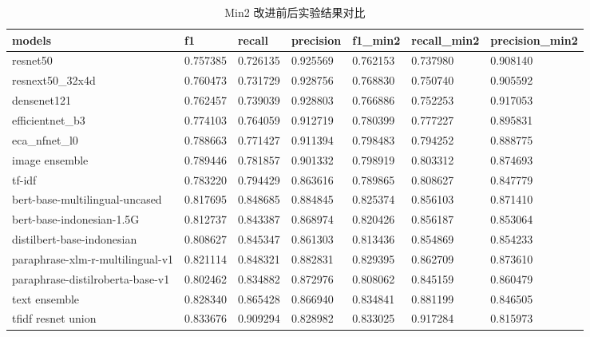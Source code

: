 \documentclass[12pt]{article}
\begin{document}
\begin{table}[htbp]
  \centering
  \footnotesize
  \caption{Min2 改进前后实验结果对比}
  \label{tab:min2_results}
  \begin{tabular}{lllllll}
    \toprule
    models                           & f1       & recall   & precision & f1\_min2 & recall\_min2 & precision\_min2 \\
    \midrule
    resnet50                         & 0.757385 & 0.726135 & 0.925569  & 0.762153 & 0.737980     & 0.908140        \\
    resnext50\_32x4d                 & 0.760473 & 0.731729 & 0.928756  & 0.768830 & 0.750740     & 0.905592        \\
    densenet121                      & 0.762457 & 0.739039 & 0.928803  & 0.766886 & 0.752253     & 0.917053        \\
    efficientnet\_b3                 & 0.774103 & 0.764059 & 0.912719  & 0.780399 & 0.777227     & 0.895831        \\
    eca\_nfnet\_l0                   & 0.788663 & 0.771427 & 0.911394  & 0.798483 & 0.794252     & 0.888775        \\
    image ensemble                   & 0.789446 & 0.781857 & 0.901332  & 0.798919 & 0.803312     & 0.874693        \\
    tf-idf                           & 0.783220 & 0.794429 & 0.863616  & 0.789865 & 0.808627     & 0.847779        \\
    bert-base-multilingual-uncased   & 0.817695 & 0.848685 & 0.884845  & 0.825374 & 0.856103     & 0.871410        \\
    bert-base-indonesian-1.5G        & 0.812737 & 0.843387 & 0.868974  & 0.820426 & 0.856187     & 0.853064        \\
    distilbert-base-indonesian       & 0.808627 & 0.845347 & 0.861303  & 0.813436 & 0.854869     & 0.854233        \\
    paraphrase-xlm-r-multilingual-v1 & 0.821114 & 0.848321 & 0.882831  & 0.829395 & 0.862709     & 0.873610        \\
    paraphrase-distilroberta-base-v1 & 0.802462 & 0.834882 & 0.872976  & 0.808062 & 0.845159     & 0.860479        \\
    text ensemble                    & 0.828340 & 0.865428 & 0.866940  & 0.834841 & 0.881199     & 0.846505        \\
    tfidf resnet union               & 0.833676 & 0.909294 & 0.828982  & 0.833025 & 0.917284     & 0.815973        \\

\end{tabular}
\end{table}
\end{document}
